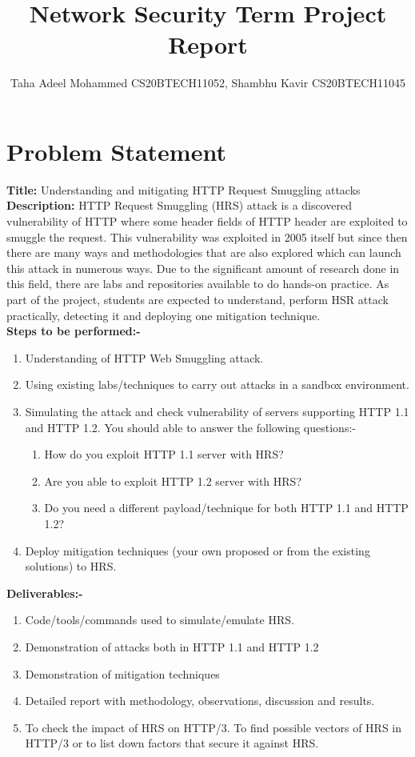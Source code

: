\documentclass[conference]{IEEEtran}
\title {Network Security Term Project Report}
\author{Taha Adeel Mohammed  {\small CS20BTECH11052}, Shambhu Kavir {\small CS20BTECH11045}  }
\begin{document}
\maketitle

\section{Problem Statement}
\noindent
\textbf{Title:} Understanding and mitigating HTTP Request Smuggling attacks  \\

\noindent
\textbf{Description:} HTTP Request Smuggling (HRS) attack is a discovered vulnerability of HTTP where some header fields of HTTP header are exploited to smuggle the request. This vulnerability was exploited in 2005 itself but since then there are many ways and methodologies that are also explored which can launch this attack in numerous ways. Due to the significant amount of research done in this field, there are labs and repositories available to do hands-on practice. As part of the project, students are expected to understand, perform HSR attack practically, detecting it and deploying one mitigation technique.  \\

\noindent
\textbf{Steps to be performed:-}
\begin{enumerate}
	\item Understanding of HTTP Web Smuggling attack.
	\item Using existing labs/techniques to carry out attacks in a sandbox environment.
	\item Simulating the attack and check vulnerability of servers supporting HTTP 1.1 and HTTP 1.2. You should able to answer the following questions:-
	\begin{enumerate}
		\item How do you exploit HTTP 1.1 server with HRS?
		\item Are you able to exploit HTTP 1.2  server with HRS?
		\item Do you need a different payload/technique for both HTTP 1.1 and HTTP 1.2?
	\end{enumerate}
	\item Deploy mitigation techniques (your own proposed or from the existing solutions) to HRS.
\end{enumerate}

\noindent
\textbf{Deliverables:-}
\begin{enumerate}
	\item Code/tools/commands used to simulate/emulate HRS.
	\item Demonstration of attacks both in HTTP 1.1 and HTTP 1.2
	\item Demonstration of mitigation techniques
	\item Detailed report with methodology, observations, discussion and results.
	\item To check the impact of HRS on HTTP/3. To find possible vectors of HRS in HTTP/3 or to list down factors that secure it against HRS.
\end{enumerate}
\end{document}
